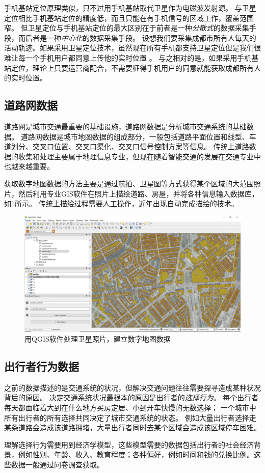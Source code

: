 手机基站定位原理类似，只不过用手机基站取代卫星作为电磁波发射源。
与卫星定位相比手机基站定位的精度低，而且只能在有手机信号的区域工作，覆盖范围窄。
但卫星定位与手机基站定位的最大区别在于前者是一种\emph{分散式}的数据采集手段，而后者是一种\emph{中心化}的数据采集手段。
设想我们要采集成都市所有人每天的活动轨迹。如果采用卫星定位技术，虽然现在所有手机都支持卫星定位但是我们很难让每一个手机用户都同意上传他的实时位置
。
与之相对的是，如果采用手机基站定位，理论上只要运营商配合，不需要征得手机用户的同意就能获取成都所有人的实时位置。

\subsection{道路网数据}
道路网是城市交通最重要的基础设施，道路网数据是分析城市交通系统的基础数据。
道路网数据是城市地图数据的组成部分，一般包括道路平面位置和线型、车道划分、交叉口位置、交叉口渠化、交叉口信号控制方案等信息。
传统上道路数据的收集和处理主要属于地理信息专业，但现在随着智能交通的发展在交通专业中也越来越重要。

获取数字地图数据的方法主要是通过航拍、卫星图等方式获得某个区域的大范围照片，然后利用专业GIS软件在照片上描绘道路、房屋，并将各种信息输入数据库，如\cref{fig:gis-data-collection}所示。
传统上描绘过程需要人工操作，近年出现自动完成描绘的技术。
\begin{figure}
    \includegraphics[width=\linewidth]{images/gis-data-collection.jpg}
    \caption{用QGIS软件处理卫星照片，建立数字地图数据}
    \label{fig:gis-data-collection}
\end{figure}

\subsection{出行者行为数据}
之前的数据描述的是交通系统的状况，但解决交通问题往往需要探寻造成某种状况背后的原因。
决定交通系统状况最根本的原因是出行者的\emph{选择行为}。
每个出行者每天都面临着大到在什么地方买房定居、小到开车快慢的无数选择；
一个城市中所有出行者的所有选择共同决定了城市交通系统的状态。
例如大量出行者选择走某条道路会造成该道路拥堵，大量出行者同时去某个区域会造成该区域停车困难。

理解选择行为需要用到经济学模型，这些模型需要的数据包括出行者的社会经济背景，例如性别、年龄、收入、教育程度；各种偏好，例如时间和钱的兑换比例。这些数据一般通过问卷调查获取。